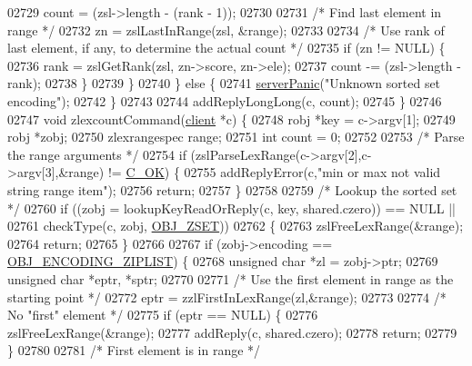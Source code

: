 \begin{DoxyCode}
02729             count = (zsl->length - (rank - 1));
02730 
02731             \textcolor{comment}{/* Find last element in range */}
02732             zn = zslLastInRange(zsl, &range);
02733 
02734             \textcolor{comment}{/* Use rank of last element, if any, to determine the actual count */}
02735             \textcolor{keywordflow}{if} (zn != NULL) \{
02736                 rank = zslGetRank(zsl, zn->score, zn->ele);
02737                 count -= (zsl->length - rank);
02738             \}
02739         \}
02740     \} \textcolor{keywordflow}{else} \{
02741         \hyperlink{server_8h_a11cc378e7778a830b41240578de3b204}{serverPanic}(\textcolor{stringliteral}{"Unknown sorted set encoding"});
02742     \}
02743 
02744     addReplyLongLong(c, count);
02745 \}
02746 
02747 \textcolor{keywordtype}{void} zlexcountCommand(\hyperlink{structclient}{client} *c) \{
02748     robj *key = c->argv[1];
02749     robj *zobj;
02750     zlexrangespec range;
02751     \textcolor{keywordtype}{int} count = 0;
02752 
02753     \textcolor{comment}{/* Parse the range arguments */}
02754     \textcolor{keywordflow}{if} (zslParseLexRange(c->argv[2],c->argv[3],&range) != \hyperlink{server_8h_a303769ef1065076e68731584e758d3e1}{C\_OK}) \{
02755         addReplyError(c,\textcolor{stringliteral}{"min or max not valid string range item"});
02756         \textcolor{keywordflow}{return};
02757     \}
02758 
02759     \textcolor{comment}{/* Lookup the sorted set */}
02760     \textcolor{keywordflow}{if} ((zobj = lookupKeyReadOrReply(c, key, shared.czero)) == NULL ||
02761         checkType(c, zobj, \hyperlink{server_8h_a8c356422ddbc03bd77694880a30a1953}{OBJ\_ZSET}))
02762     \{
02763         zslFreeLexRange(&range);
02764         \textcolor{keywordflow}{return};
02765     \}
02766 
02767     \textcolor{keywordflow}{if} (zobj->encoding == \hyperlink{server_8h_aabf064ede983103f1fd0df2086e84eee}{OBJ\_ENCODING\_ZIPLIST}) \{
02768         \textcolor{keywordtype}{unsigned} \textcolor{keywordtype}{char} *zl = zobj->ptr;
02769         \textcolor{keywordtype}{unsigned} \textcolor{keywordtype}{char} *eptr, *sptr;
02770 
02771         \textcolor{comment}{/* Use the first element in range as the starting point */}
02772         eptr = zzlFirstInLexRange(zl,&range);
02773 
02774         \textcolor{comment}{/* No "first" element */}
02775         \textcolor{keywordflow}{if} (eptr == NULL) \{
02776             zslFreeLexRange(&range);
02777             addReply(c, shared.czero);
02778             \textcolor{keywordflow}{return};
02779         \}
02780 
02781         \textcolor{comment}{/* First element is in range */}

\end{DoxyCode}
